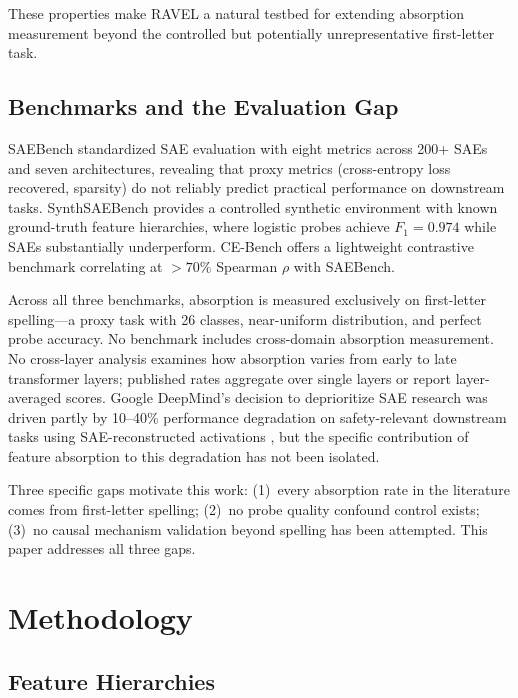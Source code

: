 \documentclass{article}
\begin{document}
These properties make RAVEL a natural testbed for extending absorption measurement beyond the controlled but potentially unrepresentative first-letter task.

\subsection{Benchmarks and the Evaluation Gap}

SAEBench \citep{karvonen2025saebench} standardized SAE evaluation with eight metrics across 200+ SAEs and seven architectures, revealing that proxy metrics (cross-entropy loss recovered, sparsity) do not reliably predict practical performance on downstream tasks. SynthSAEBench \citep{synthsaebench2026} provides a controlled synthetic environment with known ground-truth feature hierarchies, where logistic probes achieve $F_1 = 0.974$ while SAEs substantially underperform. CE-Bench \citep{gulko2025cebench} offers a lightweight contrastive benchmark correlating at $> 70\%$ Spearman $\rho$ with SAEBench.

Across all three benchmarks, absorption is measured exclusively on first-letter spelling---a proxy task with 26 classes, near-uniform distribution, and perfect probe accuracy. No benchmark includes cross-domain absorption measurement. No cross-layer analysis examines how absorption varies from early to late transformer layers; published rates aggregate over single layers or report layer-averaged scores. Google DeepMind's decision to deprioritize SAE research was driven partly by 10--40\% performance degradation on safety-relevant downstream tasks using SAE-reconstructed activations \citep{smith2025deprioritize}, but the specific contribution of feature absorption to this degradation has not been isolated.

Three specific gaps motivate this work: (1)~every absorption rate in the literature comes from first-letter spelling; (2)~no probe quality confound control exists; (3)~no causal mechanism validation beyond spelling has been attempted. This paper addresses all three gaps.

\section{Methodology}
\label{sec:method}

\subsection{Feature Hierarchies}
\end{document}
